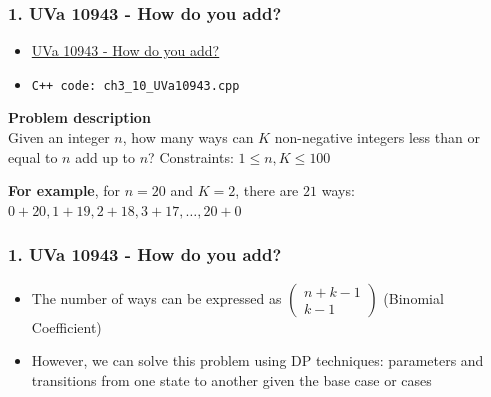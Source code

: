 \documentclass{beamer}
\begin{document}
\begin{frame}[fragile]
\frametitle{1. UVa 10943 - How do you add?}

\begin{itemize}
    \item \href{https://onlinejudge.org/index.php?option=com_onlinejudge&Itemid=8&category=21&page=show_problem&problem=1884}{UVa 10943 - How do you add?}
    \item \color{red}\verb|C++ code: ch3_10_UVa10943.cpp|\color{black}
\end{itemize}

\vspace{0.3cm}

\color{red}\textbf{Problem description}\color{black} \\

Given an integer $n$, how many ways can $K$ non-negative integers less than or equal to $n$ add up to $n$? Constraints: $1 \leq n, K \leq 100$

\pause
\vspace{0.3cm}

\textbf{For example}, for $n=20$ and $K=2$, there are $21$ ways: $0+20,1+19,2+18,3+17,\ldots,20+0$

\end{frame}


\begin{frame}[fragile]
\frametitle{1. UVa 10943 - How do you add?}

\begin{itemize}
    \item The number of ways can be expressed as $\begin{pmatrix} n+k-1 \\ k-1 \end{pmatrix}$ (Binomial Coefficient)
    \item However, we can solve this problem using DP techniques: parameters and transitions from one state to another given the base case or cases
\end{itemize}

\end{frame}
\end{document}
